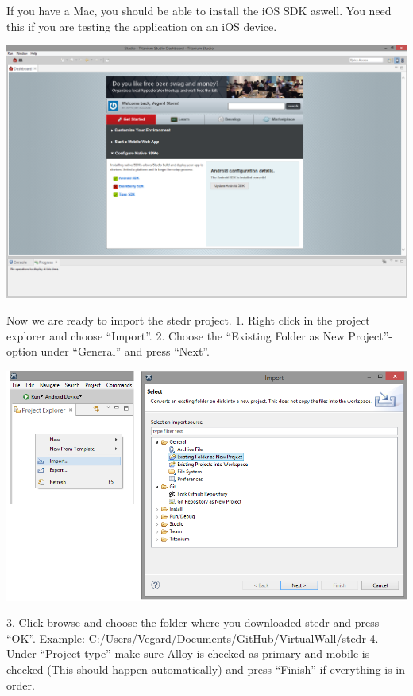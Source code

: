 If you have a Mac, you should be able to install the iOS SDK aswell. You need this if you are testing the application on an iOS device.

\begin{center}
\includegraphics[scale=0.3]{guide/f1.png} 
\end{center}

Now we are ready to import the stedr project.
1. Right click in the project explorer and choose “Import”.
2. Choose the “Existing Folder as New Project”-option under “General” and press “Next”.

\begin{center}
\includegraphics[scale=0.45]{guide/f2.png} 
\end{center}

3. Click browse and choose the folder where you downloaded stedr and press “OK”. 
Example: C:/Users/Vegard/Documents/GitHub/VirtualWall/stedr
4. Under “Project type” make sure Alloy is checked as primary and mobile is checked (This should happen automatically) and press “Finish” if everything is in order.

